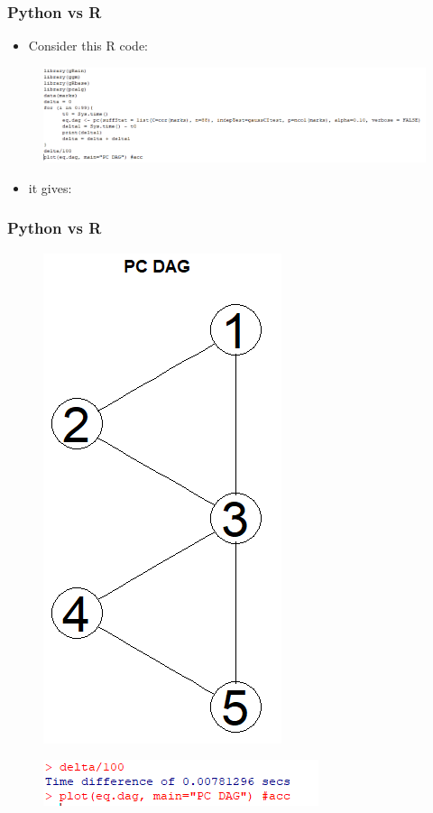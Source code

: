 \documentclass[xcolor ={table,usenames,dvipsnames}]{beamer}
\theoremstyle{definition}
\begin{document}
\begin{frame}
\frametitle{Python vs R}
\begin{itemize}
	\item Consider this R code:
\end{itemize}
	\begin{figure}[h!]
		\centering
		\includegraphics[scale=0.5]{img/r.PNG}
	\end{figure}
\begin{itemize}
	\item it gives:
	\end{itemize}
\end{frame}
\begin{frame}
\frametitle{Python vs R}
\begin{figure}[h!]
	\centering
	\includegraphics[scale=0.35]{img/rdag.PNG}
\end{figure}
\begin{figure}[h!]
	\centering
	\includegraphics[scale=0.5]{img/rtime}
\end{figure}
\end{frame}
\end{document}
